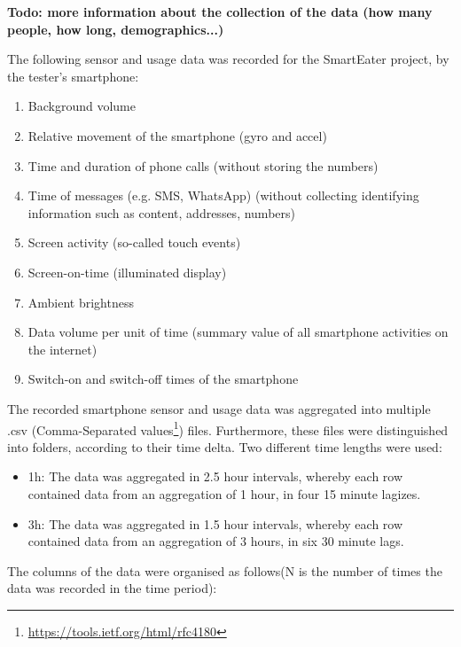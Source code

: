 \textbf{Todo: more information about the collection of the data (how many people, how long, demographics...)}


The following  sensor and usage data was recorded for the SmartEater project, by the tester's smartphone:

\begin{enumerate}
	\item Background volume
	\item Relative movement of the smartphone (gyro and accel)
	\item Time and duration of phone calls (without storing the numbers)
	\item Time of messages (e.g. SMS, WhatsApp) (without collecting identifying information such as content, addresses, numbers)
	\item Screen activity (so-called touch events)
	\item Screen-on-time (illuminated display)
	\item Ambient brightness
	\item Data volume per unit of time (summary value of all smartphone activities on the internet)
	\item Switch-on and switch-off times of the smartphone
\end{enumerate}

The recorded smartphone sensor and usage data was aggregated into multiple .csv (Comma-Separated values\footnote{\url{https://tools.ietf.org/html/rfc4180}}) files. Furthermore, these files were distinguished into folders, according to their time delta. Two different time lengths were used:

\begin{itemize}
  \item 1h: The data was aggregated in 2.5 hour intervals, whereby each row contained data from an aggregation of 1 hour, in four 15 minute lagizes.
  \item 3h: The data was aggregated in 1.5 hour intervals, whereby each row contained data from an aggregation of 3 hours, in six 30 minute lags.
\end{itemize}

The columns of the data were organised as follows(N is the number of times the data was recorded in the time period): 

